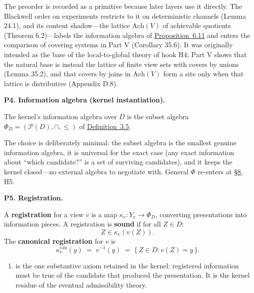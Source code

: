 The preorder is recorded as a primitive because later layers use it directly. The Blackwell order on experiments restricts to it on deterministic channels (Lemma 24.1), and its content shadow---\hspace{0pt}the lattice \(\mathrm{Ach}(V)\) of achievable quotients (Theorem 6.2)---\hspace{0pt}labels the information algebra of \hyperlink{stmt:6.11}{Proposition~6.11} and enters the comparison of covering systems in Part V (Corollary 35.6). It was originally intended as the base of the local-to-global theory of hook H4; Part V shows that the natural base is instead the lattice of finite view sets with covers by unions (Lemma 35.2), and that covers by joins in \(\mathrm{Ach}(V)\) form a site only when that lattice is distributive (Appendix D.8).

\textbf{P4. Information algebra (kernel instantiation).}

\begin{thmdef}

The kernel's information algebra over \(D\) is the subset algebra \(\Phi_D = (\mathcal{P}(D), \cap, \le)\) of \hyperlink{stmt:3.5}{Definition~3.5}.
\end{thmdef}

The choice is deliberately minimal: the subset algebra is the smallest genuine information algebra, it is universal for the exact case (any exact information about ``which candidate?'' is a set of surviving candidates), and it keeps the kernel closed---\hspace{0pt}no external algebra to negotiate with. General \(\Phi\) re-enters at \hyperlink{sec:8}{§8}, H5.

\textbf{P5. Registration.}

\begin{thmdef}

A \textbf{registration} for a view \(v\) is a map \(\kappa_v : Y_v \to \Phi_D\), converting presentations into information pieces. A registration is \textbf{sound} if for all \(Z \in D\):
\[
Z \in \kappa_v(v(Z)).
\tag{S}
\]
The \textbf{canonical registration} for \(v\) is
\[
\kappa^{\mathrm{can}}_v(y) \;=\; v^{-1}(y) \;=\; \{\, Z \in D : v(Z) = y \,\}.
\]
\end{thmdef}

\begin{enumerate}
\def\labelenumi{(\Alph{enumi})}
\setcounter{enumi}{18}
\tightlist
\item
  is the one substantive axiom retained in the kernel: registered information must be true of the candidate that produced the presentation. It is the kernel residue of the eventual admissibility theory.
\end{enumerate}

